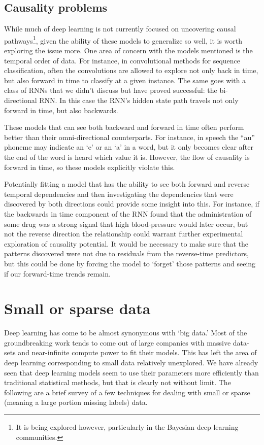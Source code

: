 \documentclass[]{book}
\let\rmarkdownfootnote\footnote%
\def\footnote{\protect\rmarkdownfootnote}
\theoremstyle{definition}
\theoremstyle{definition}
\theoremstyle{definition}
\theoremstyle{remark}
\begin{document}
\subsection{Causality problems}\label{causality-problems}

While much of deep learning is not currently focused on uncovering
causal pathways\footnote{It is being explored however, particularly in
  the Bayesian deep learning communities.}, given the ability of these
models to generalize so well, it is worth exploring the issue more. One
area of concern with the models mentioned is the temporal order of data.
For instance, in convolutional methods for sequence classification,
often the convolutions are allowed to explore not only back in time, but
also forward in time to classify at a given instance. The same goes with
a class of RNNs that we didn't discuss but have proved successful: the
bi-directional RNN. In this case the RNN's hidden state path travels not
only forward in time, but also backwards.

These models that can see both backward and forward in time often
perform better than their omni-directional counterparts. For instance,
in speech the ``au'' phoneme may indicate an `e' or an `a' in a word,
but it only becomes clear after the end of the word is heard which value
it is. However, the flow of causality is forward in time, so these
models explicitly violate this.

Potentially fitting a model that has the ability to see both forward and
reverse temporal dependencies and then investigating the dependencies
that were discovered by both directions could provide some insight into
this. For instance, if the backwards in time component of the RNN found
that the administration of some drug was a strong signal that high
blood-pressure would later occur, but not the reverse direction the
relationship could warrant further experimental exploration of causality
potential. It would be necessary to make sure that the patterns
discovered were not due to residuals from the reverse-time predictors,
but this could be done by forcing the model to `forget' those patterns
and seeing if our forward-time trends remain.

\section{Small or sparse data}\label{small-or-sparse-data}

Deep learning has come to be almost synonymous with `big data.' Most of
the groundbreaking work tends to come out of large companies with
massive data-sets and near-infinite compute power to fit their models.
This has left the area of deep learning corresponding to small data
relatively unexplored. We have already seen that deep learning models
seem to use their parameters more efficiently than traditional
statistical methods, but that is clearly not without limit. The
following are a brief survey of a few techniques for dealing with small
or sparse (meaning a large portion missing labels) data.
\end{document}
